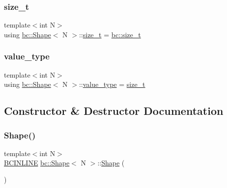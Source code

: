 \subsubsection{\texorpdfstring{size\+\_\+t}{size\_t}}
{\footnotesize\ttfamily template$<$int N$>$ \\
using \hyperlink{structbc_1_1Shape}{bc\+::\+Shape}$<$ N $>$\+::\hyperlink{structbc_1_1Shape_a63f974ebdb0e3755ef3140b17abcf235}{size\+\_\+t} =  \hyperlink{namespacebc_aaf8e3fbf99b04b1b57c4f80c6f55d3c5}{bc\+::size\+\_\+t}}

\mbox{\label{structbc_1_1Shape_a52aafd6585a5eae8a3b82f650d3afc1c}} 
\subsubsection{\texorpdfstring{value\+\_\+type}{value\_type}}
{\footnotesize\ttfamily template$<$int N$>$ \\
using \hyperlink{structbc_1_1Shape}{bc\+::\+Shape}$<$ N $>$\+::\hyperlink{structbc_1_1Shape_a52aafd6585a5eae8a3b82f650d3afc1c}{value\+\_\+type} =  \hyperlink{structbc_1_1Shape_a63f974ebdb0e3755ef3140b17abcf235}{size\+\_\+t}}



\subsection{Constructor \& Destructor Documentation}
\mbox{\label{structbc_1_1Shape_a1f9f9b18b122fbee5880a5b6a456781f}} 
\subsubsection{\texorpdfstring{Shape()}{Shape()}\hspace{0.1cm}{\footnotesize\ttfamily [1/6]}}
{\footnotesize\ttfamily template$<$int N$>$ \\
\hyperlink{common_8h_a6699e8b0449da5c0fafb878e59c1d4b1}{B\+C\+I\+N\+L\+I\+NE} \hyperlink{structbc_1_1Shape}{bc\+::\+Shape}$<$ N $>$\+::\hyperlink{structbc_1_1Shape}{Shape} (\begin{DoxyParamCaption}{ }\end{DoxyParamCaption})\hspace{0.3cm}{\ttfamily [inline]}}

